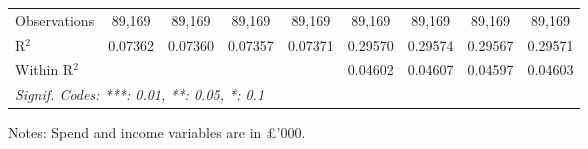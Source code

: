\begin{table}[htbp]
\begin{threeparttable}[b]
\begin{tabular}{lcccccccc}
         Observations             & 89,169           & 89,169           & 89,169           & 89,169           & 89,169           & 89,169           & 89,169           & 89,169\\  
         R$^2$                    & 0.07362          & 0.07360          & 0.07357          & 0.07371          & 0.29570          & 0.29574          & 0.29567          & 0.29571\\  
         Within R$^2$             &                  &                  &                  &                  & 0.04602          & 0.04607          & 0.04597          & 0.04603\\  
         \midrule \midrule
         \multicolumn{9}{l}{\emph{Signif. Codes: ***: 0.01, **: 0.05, *: 0.1}}\\
      \end{tabular}
      
      \begin{tablenotes}\footnotesize
         \item Notes: Spend and income variables are in \pounds'000.
      \end{tablenotes}
   \end{threeparttable}
\end{table}


